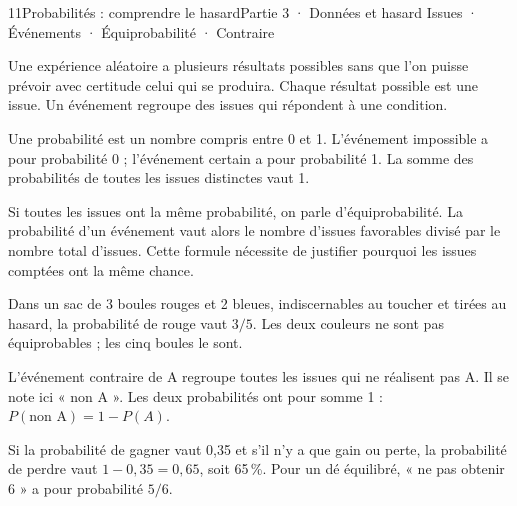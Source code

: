 \begin{ouverture}[probabilites]{11}{Probabilités : comprendre le hasard}{Partie 3 · Données et hasard}
{Issues · Événements · Équiprobabilité · Contraire}
\end{ouverture}
\pagestyle{otMain}\essentiel\fontsize{11}{15}\selectfont
{}\label{cours-11-1}
\begin{definition}Une expérience aléatoire a plusieurs résultats possibles sans que l’on puisse prévoir avec certitude celui qui se produira. Chaque résultat possible est une issue. Un événement regroupe des issues qui répondent à une condition.\end{definition}
\begin{propriete}Une probabilité est un nombre compris entre 0 et 1. L’événement impossible a pour probabilité 0 ; l’événement certain a pour probabilité 1. La somme des probabilités de toutes les issues distinctes vaut 1.\end{propriete}
\begin{propriete}Si toutes les issues ont la même probabilité, on parle d’équiprobabilité. La probabilité d’un événement vaut alors le nombre d’issues favorables divisé par le nombre total d’issues. Cette formule nécessite de justifier pourquoi les issues comptées ont la même chance.\end{propriete}
\begin{exemple}Dans un sac de 3 boules rouges et 2 bleues, indiscernables au toucher et tirées au hasard, la probabilité de rouge vaut $3/5$. Les deux couleurs ne sont pas équiprobables ; les cinq boules le sont.\end{exemple}
\clearpage
{}\label{cours-11-2}
\begin{definition}L’événement contraire de A regroupe toutes les issues qui ne réalisent pas A. Il se note ici « non A ». Les deux probabilités ont pour somme 1 : $P(\text{non A})=1-P(A)$.\end{definition}
\begin{exemple}Si la probabilité de gagner vaut 0,35 et s’il n’y a que gain ou perte, la probabilité de perdre vaut $1-0{,}35=0{,}65$, soit 65\,\%. Pour un dé équilibré, « ne pas obtenir 6 » a pour probabilité $5/6$.\end{exemple}
\label{fig-cours-11-2-cours-urne}

